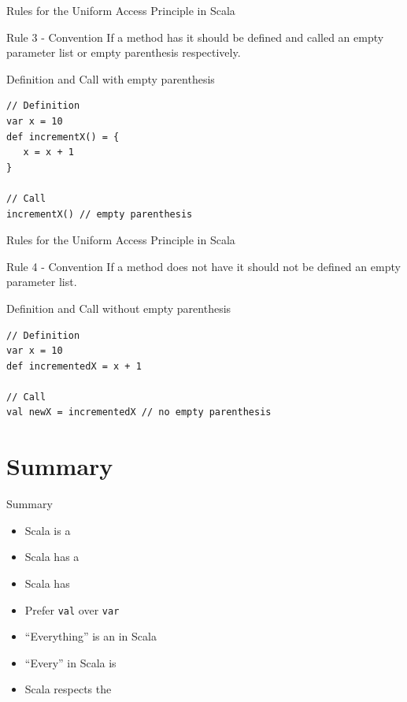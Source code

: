 \begin{frame}[fragile]{Rules for the Uniform Access Principle in Scala}
\begin{block}{Rule 3 - Convention}
If a method \alert{has}  it \alert{should} be
defined \alert{and} called  an empty parameter list or empty
parenthesis respectively.
\end{block}
\pause
\begin{exampleblock}{Definition and Call with empty parenthesis}
\begin{lstlisting}
// Definition
var x = 10
def incrementX() = {
   x = x + 1
}

// Call
incrementX() // empty parenthesis
\end{lstlisting}
\end{exampleblock}
\end{frame}

\begin{frame}[fragile]{Rules for the Uniform Access Principle in Scala}
\begin{block}{Rule 4 - Convention}
If a method \alert{does not have}  it \alert{should not}
be defined  an empty parameter list.
\end{block}
\pause
\begin{exampleblock}{Definition and Call without empty parenthesis}
\begin{lstlisting}
// Definition
var x = 10
def incrementedX = x + 1

// Call
val newX = incrementedX // no empty parenthesis
\end{lstlisting}
\end{exampleblock}
\end{frame}

\section{Summary}
\begin{frame}{Summary}
\begin{itemize}
  \item Scala is a 
  \item Scala has a 
  \item Scala has 
  \item Prefer \lstinline!val! over \lstinline!var!
  \item ``Everything'' is an  in Scala
  \item ``Every''  in Scala is 
  \item Scala respects the 
\end{itemize}
\end{frame}